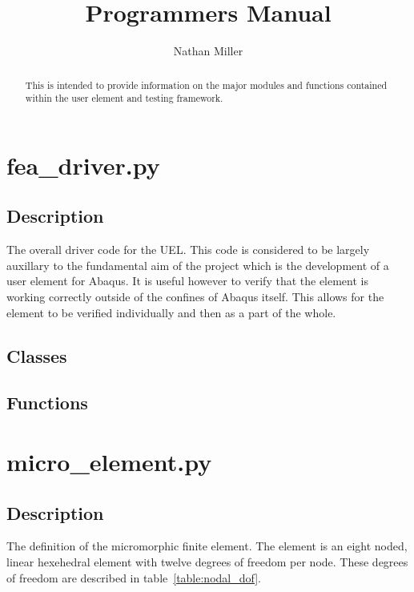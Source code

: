 \documentclass{asme2ej}
\begin{document}
\title{Programmers Manual}
\author{Nathan Miller}

\maketitle

\begin{abstract}

This is intended to provide information on the major modules and functions contained within the user element and testing framework.

\end{abstract}

\tableofcontents
\clearpage

\section{fea\_driver.py}

\subsection{Description}

The overall driver code for the UEL. This code is considered to be largely auxillary to the fundamental aim of the project which is the development of a user element for Abaqus. It is useful however to verify that the element is working correctly outside of the confines of Abaqus itself. This allows for the element to be verified individually and then as a part of the whole.

\subsection{Classes}



\subsection{Functions}


\clearpage
\section{micro\_element.py}

\subsection{Description}

The definition of the micromorphic finite element. The element is an eight noded, linear hexehedral element with twelve degrees of freedom per node. These degrees of freedom are described in table~\ref{table:nodal_dof}.
\end{document}
